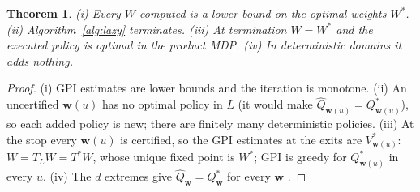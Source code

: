 \documentclass[11pt]{article}
\newcommand{\w}{\mathbf{w}}
\newtheorem{theorem}{Theorem}
\begin{document}
\begin{theorem}
(i) Every $W$ computed is a lower bound on the optimal weights $W^*$. (ii) Algorithm~\ref{alg:lazy} terminates. (iii)
At termination $W=W^*$ and the executed policy is optimal in the product MDP. (iv) In deterministic domains it adds
nothing.
\end{theorem}
\begin{proof}
(i) GPI estimates are lower bounds and the iteration is monotone. (ii) An uncertified $\w(u)$ has no optimal policy in
$L$ (it would make $\hat Q_{\w(u)}=Q^*_{\w(u)}$), so each added policy is new; there are finitely many deterministic
policies. (iii) At the stop every $\w(u)$ is certified, so the GPI estimates at the exits are $V^*_{\w(u)}$: $W=T_LW=T^*W$,
whose unique fixed point is $W^*$; GPI is greedy for $Q^*_{\w(u)}$ in every $u$. (iv) The $d$ extremes give
$\hat Q_\w=Q^*_\w$ for every $\w$ \cite{note}.
\end{proof}
\end{document}
